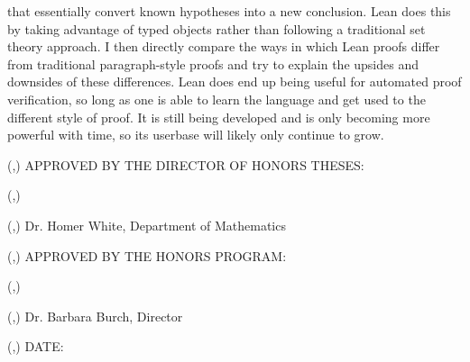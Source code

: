 \begin{titlepage}
\begin{textblock*}{\textwidth}
that essentially convert known hypotheses into a new conclusion. Lean does this by taking advantage 
of typed objects rather than following a traditional set theory approach. I then directly compare 
the ways in which Lean proofs differ from traditional paragraph-style proofs and try to explain 
the upsides and downsides of these differences. Lean does end up being useful for automated proof 
verification, so long as one is able to learn the language and get used to the different style of 
proof. It is still being developed and is only becoming more powerful with time, so its userbase will 
likely only continue to grow.
\end{textblock*}
\pagebreak
\thispagestyle{empty}
\begin{textblock*}{\paperwidth}(\fromleft{2in},\fromtop{144pt})
APPROVED BY THE DIRECTOR OF HONORS THESES:
\end{textblock*}
\begin{textblock*}{\paperwidth}(\fromleft{3in},\fromtop{192pt})
\underline{\hspace{4.5in}}
\end{textblock*}
\begin{textblock*}{\paperwidth}(\fromleft{3in},\fromtop{216pt})
Dr. Homer White, Department of Mathematics
\end{textblock*}
\begin{textblock*}{\paperwidth}(\fromleft{2in},\fromtop{396pt})
APPROVED BY THE HONORS PROGRAM:
\end{textblock*}
\begin{textblock*}{\paperwidth}(\fromleft{2in},\fromtop{444pt})
\underline{\hspace{4.5in}}
\end{textblock*}
\begin{textblock*}{\paperwidth}(\fromleft{2in},\fromtop{468pt})
Dr. Barbara Burch, Director
\end{textblock*}
\begin{textblock*}{\paperwidth}(\fromleft{1.5in},\fromtop{612pt})
DATE:\underline{\hspace{2in}}
\end{textblock*}
\end{titlepage}